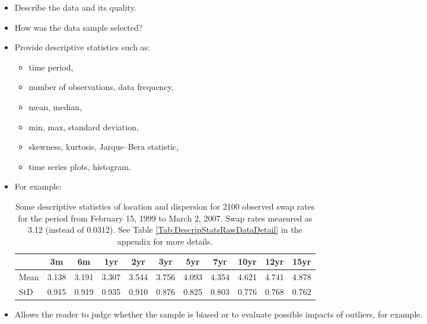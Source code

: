 \begin{itemize}

    \item Describe the data and its quality.
    \item How was the data sample selected?
    \item Provide descriptive statistics such as:
        \begin{itemize}
            \item time period,
            \item number of observations, data frequency,
            \item mean, median,
            \item min, max, standard deviation,
            \item skewness, kurtosis, Jarque--Bera statistic,
            \item time series plots, histogram.
        \end{itemize}
    \item For example:
        \begin{table}[ht]

        \begin{center}
            {\footnotesize
            \begin{tabular}{l|cccccccccc}
                \hline \hline
                           & 3m    & 6m    & 1yr   & 2yr   & 3yr   & 5yr   & 7yr   & 10yr  & 12yr  & 15yr   \\
                \hline
                    Mean   & 3.138 & 3.191 & 3.307 & 3.544 & 3.756 & 4.093 & 4.354 & 4.621 & 4.741 & 4.878  \\
                    StD    & 0.915 & 0.919 & 0.935 & 0.910 & 0.876 & 0.825 & 0.803 & 0.776 & 0.768 & 0.762  \\
                \hline \hline
            \end{tabular}}
        \end{center}
        \caption{Some descriptive statistics of location and dispersion for
        2100 observed swap rates for the period from February 15, 1999
        to March 2, 2007. Swap rates measured as 3.12 (instead of 0.0312). See Table
        \ref{Tab:DescripStatsRawDataDetail} in the appendix for
        more details.}
        \label{Tab:DescripStatsRawData}
        \end{table}

    \item Allows the reader to judge whether the sample is biased or to evaluate possible impacts of outliers, for
    example.

\end{itemize}
